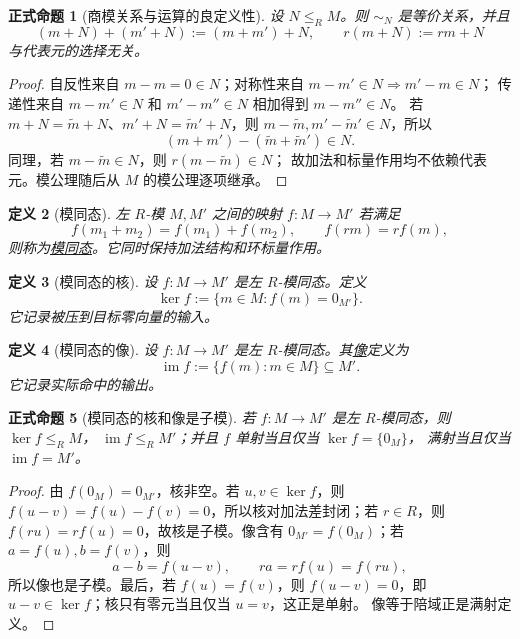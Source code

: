 \documentclass[UTF8,fontset=none,a4paper,11pt]{ctexart}
\theoremstyle{foundation-definition}
\newtheorem{definition}{定义}[section]
\theoremstyle{foundation-theorem}
\theoremstyle{foundation-proposition}
\newtheorem{proposition}[definition]{正式命题}
\theoremstyle{foundation-example}
\theoremstyle{foundation-remark}
\theoremstyle{foundation-theorem}
\newcommand{\term}[2]{\hyperref[#1]{#2}}
\begin{document}
\begin{proposition}[商模关系与运算的良定义性]\label{prop:quotient-module-well-defined}
设 \(N\leq_R M\)。则 \(\sim_N\) 是等价关系，并且
\[
(m+N)+(m'+N):=(m+m')+N,\qquad r(m+N):=rm+N
\]
与代表元的选择无关。
\end{proposition}

\begin{proof}
自反性来自 \(m-m=0\in N\)；对称性来自 \(m-m'\in N\Rightarrow m'-m\in N\)；
传递性来自 \(m-m'\in N\) 和 \(m'-m''\in N\) 相加得到 \(m-m''\in N\)。
若 \(m+N=\widetilde m+N\)、\(m'+N=\widetilde m'+N\)，则
\(m-\widetilde m,m'-\widetilde m'\in N\)，所以
\[
(m+m')-(\widetilde m+\widetilde m')\in N.
\]
同理，若 \(m-\widetilde m\in N\)，则 \(r(m-\widetilde m)\in N\)；
故加法和标量作用均不依赖代表元。模公理随后从 \(M\) 的模公理逐项继承。
\end{proof}

\begin{definition}[模同态]\label{def:module-hom}
左 \(R\)-模 \(M,M'\) 之间的映射 \(f:M\to M'\) 若满足
\[
f(m_1+m_2)=f(m_1)+f(m_2),
\qquad f(rm)=rf(m),
\]
则称为\term{def:module-hom}{模同态}。它同时保持加法结构和环标量作用。
\end{definition}

\begin{definition}[模同态的核]\label{def:module-kernel}
设 \(f:M\to M'\) 是左 \(R\)-模同态。定义
\[
\ker f:=\{m\in M:f(m)=0_{M'}\}.
\]
它记录被压到目标零向量的输入。
\end{definition}

\begin{definition}[模同态的像]\label{def:module-image}
设 \(f:M\to M'\) 是左 \(R\)-模同态。其\term{def:module-image}{像}定义为
\[
\operatorname{im}f:=\{f(m):m\in M\}\subseteq M'.
\]
它记录实际命中的输出。
\end{definition}

\begin{proposition}[模同态的核和像是子模]\label{prop:module-kernel-image}
若 \(f:M\to M'\) 是左 \(R\)-模同态，则 \(\ker f\leq_R M\)，
\(\operatorname{im}f\leq_R M'\)；并且 \(f\) 单射当且仅当 \(\ker f=\{0_M\}\)，
满射当且仅当 \(\operatorname{im}f=M'\)。
\end{proposition}

\begin{proof}
由 \(f(0_M)=0_{M'}\)，核非空。若 \(u,v\in\ker f\)，则
\(f(u-v)=f(u)-f(v)=0\)，所以核对加法差封闭；若 \(r\in R\)，则
\(f(ru)=rf(u)=0\)，故核是子模。像含有 \(0_{M'}=f(0_M)\)；若
\(a=f(u),b=f(v)\)，则
\[
a-b=f(u-v),\qquad ra=rf(u)=f(ru),
\]
所以像也是子模。最后，若 \(f(u)=f(v)\)，则
\(f(u-v)=0\)，即 \(u-v\in\ker f\)；核只有零元当且仅当 \(u=v\)，这正是单射。
像等于陪域正是满射定义。
\end{proof}
\end{document}
